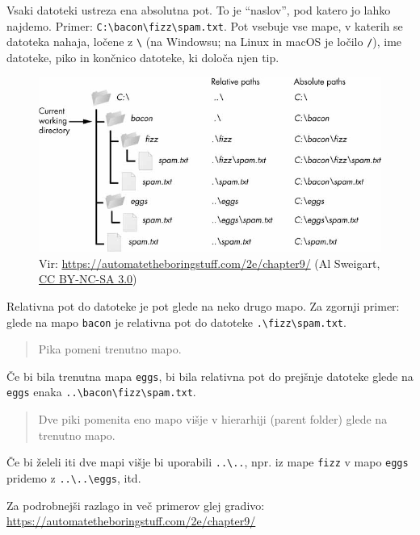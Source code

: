 \documentclass[
]{report}
\begin{document}
Vsaki datoteki ustreza ena absolutna pot. To je ``naslov'', pod katero jo lahko najdemo. Primer: \texttt{C:\textbackslash{}bacon\textbackslash{}fizz\textbackslash{}spam.txt}. Pot vsebuje vse mape, v katerih se datoteka nahaja, ločene z \texttt{\textbackslash{}} (na Windowsu; na Linux in macOS je ločilo \texttt{/}), ime datoteke, piko in končnico datoteke, ki določa njen tip.

\begin{figure}
\centering
\includegraphics{./images/paths.jpeg}
\caption{Vir: \url{https://automatetheboringstuff.com/2e/chapter9/} (Al Sweigart, \href{https://creativecommons.org/licenses/by-nc-sa/3.0/}{CC BY-NC-SA 3.0})}
\end{figure}

Relativna pot do datoteke je pot glede na neko drugo mapo. Za zgornji primer:
glede na mapo \texttt{bacon} je relativna pot do datoteke \texttt{.\textbackslash{}fizz\textbackslash{}spam.txt}.

\begin{quote}
Pika pomeni trenutno mapo.
\end{quote}

Če bi bila trenutna mapa \texttt{eggs}, bi bila relativna pot do prejšnje datoteke
glede na \texttt{eggs} enaka \texttt{..\textbackslash{}bacon\textbackslash{}fizz\textbackslash{}spam.txt}.

\begin{quote}
Dve piki pomenita eno mapo višje v hierarhiji (parent folder) glede na trenutno mapo.
\end{quote}

Če bi želeli iti dve mapi višje bi uporabili \texttt{..\textbackslash{}..}, npr. iz mape
\texttt{fizz} v mapo \texttt{eggs} pridemo z \texttt{..\textbackslash{}..\textbackslash{}eggs}, itd.

Za podrobnejši razlago in več primerov glej gradivo: \url{https://automatetheboringstuff.com/2e/chapter9/}
\end{document}
